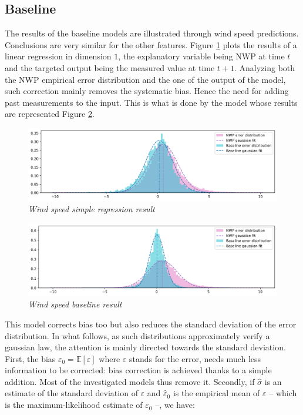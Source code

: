 \documentclass{article}
\begin{document}
\subsection*{Baseline}

The results of the baseline models are illustrated through wind speed predictions. Conclusions are very similar
for the other features. Figure \ref{fig:Fig. 4} plots the results of a linear regression in dimension $1$, the explanatory
variable being NWP at time $t$ and the targeted output being the measured value at time $t + 1$. Analyzing both
the NWP empirical error distribution and the one of the
output of the model, such correction mainly removes the systematic bias.
Hence the need for adding past measurements to the input. This is what is done by the model whose results
are represented Figure \ref{fig:Fig. 5}.


\begin{figure}[H]
    \centering
    \includegraphics[width=\linewidth]{img/base.png}
    \caption{\textit{Wind speed simple regression result}}
    \label{fig:Fig. 4}
\end{figure}

\begin{figure}[H]
    \centering
    \includegraphics[width=\linewidth]{img/baseline.png}
    \caption{\textit{Wind speed baseline result}}
    \label{fig:Fig. 5}
\end{figure}

This model corrects bias too but also reduces the standard deviation of the error distribution. In what follows,
as such distributions approximately verify a gaussian law, the attention is mainly directed towards the standard
deviation. First, the bias $\varepsilon_0 = \mathbb E [ \varepsilon ]$ where $\varepsilon$ stands for the error,
needs much less information to be corrected: bias correction is achieved thanks to a simple addition.
Most of the investigated models thus remove it. Secondly, if $\hat \sigma$ is an estimate
of the standard deviation of $\varepsilon$ and $\hat \varepsilon_0$ is the empirical mean
of $\varepsilon$ -- which is the maximum-likelihood estimate of $\varepsilon_0$ --, we have:
\end{document}
